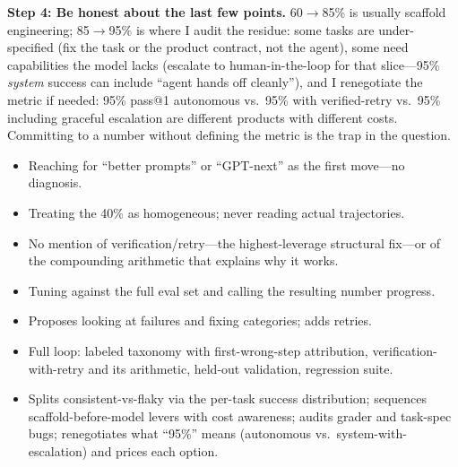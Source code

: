 \begin{interviewq}
\textbf{Step 4: Be honest about the last few points.} 60$\to$85\% is usually scaffold engineering; 85$\to$95\% is where I audit the residue: some tasks are under-specified (fix the task or the product contract, not the agent), some need capabilities the model lacks (escalate to human-in-the-loop for that slice---95\% \textit{system} success can include ``agent hands off cleanly''), and I renegotiate the metric if needed: 95\% pass@1 autonomous vs.\ 95\% with verified-retry vs.\ 95\% including graceful escalation are different products with different costs. Committing to a number without defining the metric is the trap in the question.

\redflags
\begin{itemize}
    \item Reaching for ``better prompts'' or ``GPT-next'' as the first move---no diagnosis.
    \item Treating the 40\% as homogeneous; never reading actual trajectories.
    \item No mention of verification/retry---the highest-leverage structural fix---or of the compounding arithmetic that explains why it works.
    \item Tuning against the full eval set and calling the resulting number progress.
\end{itemize}


\goodgreat
\begin{itemize}
    \item {} Proposes looking at failures and fixing categories; adds retries.
    \item {} Full loop: labeled taxonomy with first-wrong-step attribution, verification-with-retry and its arithmetic, held-out validation, regression suite.
    \item {} Splits consistent-vs-flaky via the per-task success distribution; sequences scaffold-before-model levers with cost awareness; audits grader and task-spec bugs; renegotiates what ``95\%'' means (autonomous vs.\ system-with-escalation) and prices each option.
\end{itemize}

\end{interviewq}

